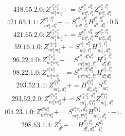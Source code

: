 \documentclass[letterpaper,10pt,fleqn,leqno,onecolumn]{article}
\begin{document}
\begin{equation} \;\;\;\;\;\;  418.65.2.0: Z^{e_{1}^{a}e_{2}^{a}}_{m_{1}^{a}m_{2}^{a}}+=S^{e_{1}^{a},d_{1}^{a}}_{m_{1}^{a},l_{1}^{a}}Z^{e_{2}^{a},l_{1}^{a}}_{m_{2}^{a},d_{1}^{a}} \end{equation}
\begin{equation} \;\;\;\;\;\;  421.65.1.1: Z^{e_{1}^{a},l_{1}^{a}}_{m_{1}^{a},d_{1}^{a}}+=S^{e_{1}^{a},d_{2}^{a}}_{m_{1}^{a},l_{2}^{a}}H^{l_{1}^{a},l_{2}^{a}}_{d_{1}^{a},d_{2}^{a}}\cdot 0.5 \end{equation}
\begin{equation} \;\;\;\;\;\;  421.65.2.0: Z^{e_{1}^{a}e_{2}^{a}}_{m_{1}^{a}m_{2}^{a}}+=S^{e_{1}^{a},d_{1}^{a}}_{m_{1}^{a},l_{1}^{a}}Z^{e_{2}^{a},l_{1}^{a}}_{m_{2}^{a},d_{1}^{a}} \end{equation}
\begin{equation} \;\;\;\;\;\;  59.16.1.0: Z^{e_{1}^{a}e_{2}^{a}}_{m_{1}^{a}m_{2}^{a}}+=S^{e_{1}^{a},d_{1}^{a}}_{m_{1}^{a},l_{1}^{a}}H^{e_{2}^{a},l_{1}^{a}}_{m_{2}^{a},d_{1}^{a}} \end{equation}
\begin{equation} \;\;\;\;\;\;  96.22.1.0: Z^{e_{1}^{a}e_{2}^{a}}_{m_{1}^{a}m_{2}^{a}}+=S^{e_{1}^{a},d_{1}^{a}d_{1}^{b}}_{m_{1}^{a}m_{2}^{a},l_{1}^{b}}H^{e_{2}^{a},l_{1}^{b}}_{d_{1}^{a}d_{1}^{b}} \end{equation}
\begin{equation} \;\;\;\;\;\;  98.22.1.0: Z^{e_{1}^{a}e_{2}^{a}}_{m_{1}^{a}m_{2}^{a}}+=S^{e_{1}^{a},d_{1}^{a}d_{2}^{a}}_{m_{1}^{a}m_{2}^{a},l_{1}^{a}}H^{e_{2}^{a},l_{1}^{a}}_{d_{1}^{a}d_{2}^{a}} \end{equation}
\begin{equation} \;\;\;\;\;\;  293.52.1.1: Z^{l_{1}^{a}l_{1}^{b}}_{m_{1}^{a},d_{1}^{b}}+=H^{l_{1}^{a}l_{1}^{b}}_{d_{1}^{b},d_{1}^{a}}S^{d_{1}^{a}}_{m_{1}^{a}} \end{equation}
\begin{equation} \;\;\;\;\;\;  293.52.2.0: Z^{e_{1}^{a}e_{2}^{a}}_{m_{1}^{a}m_{2}^{a}}+=S^{e_{1}^{a}e_{2}^{a},d_{1}^{b}}_{m_{1}^{a},l_{1}^{a}l_{1}^{b}}Z^{l_{1}^{a}l_{1}^{b}}_{m_{2}^{a},d_{1}^{b}} \end{equation}
\begin{equation} \;\;\;\;\;\;  104.23.1.0: Z^{e_{1}^{a}e_{2}^{a}}_{m_{1}^{a}m_{2}^{a}}+=S^{e_{1}^{a}e_{2}^{a},d_{1}^{b}}_{m_{1}^{a},l_{1}^{a}l_{1}^{b}}H^{l_{1}^{a}l_{1}^{b}}_{m_{2}^{a},d_{1}^{b}}\cdot -1. \end{equation}
\begin{equation} \;\;\;\;\;\;  298.53.1.1: Z^{l_{1}^{b}}_{d_{1}^{b}}+=H^{l_{1}^{b},l_{2}^{b}}_{d_{1}^{b},d_{2}^{b}}S^{d_{2}^{b}}_{l_{2}^{b}} \end{equation}
\end{document}
